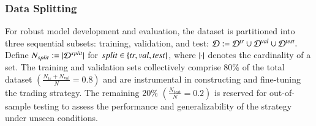 



\subsubsection*{Data Splitting}
For robust model development and evaluation, the dataset is partitioned into three sequential subsets: training, validation, and test:
$
\mathcal{D} := \mathcal{D}^{tr} \cup \mathcal{D}^{val} \cup \mathcal{D}^{test}.
$
Define $N_{split}:=|\mathcal{D}^{split}|$ for $split\in\left\{tr,val,test\right\}$, where $\left|\cdot\right|$ denotes the cardinality of a set. 
%
The training and validation sets collectively comprise 80\% of the total dataset $(\frac{N_{\text{tr}} + N_{\text{val}}}{N} = 0.8)$ and are instrumental in constructing and fine-tuning the trading strategy. The remaining 20\% $(\frac{N_{\text{test}}}{N} = 0.2)$ is reserved for out-of-sample testing to assess the performance and generalizability of the strategy under unseen conditions.
